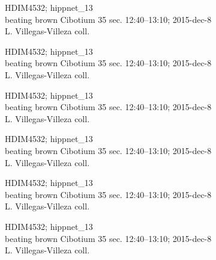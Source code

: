 \documentclass[2pt]{extarticle}
\begin{document}
\noindent
\parbox{0.16\textwidth}{\tiny \raggedright \rule[-0.3\baselineskip]{0pt}{10pt}HDIM4532; hippnet\_13\\ beating brown Cibotium 35 sec. 12:40--13:10; 2015-dec-8\\ L. Villegas-Villeza coll.}
\parbox{0.16\textwidth}{\tiny \raggedright \rule[-0.3\baselineskip]{0pt}{10pt}HDIM4532; hippnet\_13\\ beating brown Cibotium 35 sec. 12:40--13:10; 2015-dec-8\\ L. Villegas-Villeza coll.}
\parbox{0.16\textwidth}{\tiny \raggedright \rule[-0.3\baselineskip]{0pt}{10pt}HDIM4532; hippnet\_13\\ beating brown Cibotium 35 sec. 12:40--13:10; 2015-dec-8\\ L. Villegas-Villeza coll.}
\parbox{0.16\textwidth}{\tiny \raggedright \rule[-0.3\baselineskip]{0pt}{10pt}HDIM4532; hippnet\_13\\ beating brown Cibotium 35 sec. 12:40--13:10; 2015-dec-8\\ L. Villegas-Villeza coll.}
\parbox{0.16\textwidth}{\tiny \raggedright \rule[-0.3\baselineskip]{0pt}{10pt}HDIM4532; hippnet\_13\\ beating brown Cibotium 35 sec. 12:40--13:10; 2015-dec-8\\ L. Villegas-Villeza coll.}
\parbox{0.16\textwidth}{\tiny \raggedright \rule[-0.3\baselineskip]{0pt}{10pt}HDIM4532; hippnet\_13\\ beating brown Cibotium 35 sec. 12:40--13:10; 2015-dec-8\\ L. Villegas-Villeza coll.} \\ 
\vspace{0.001in} 
\end{document}
